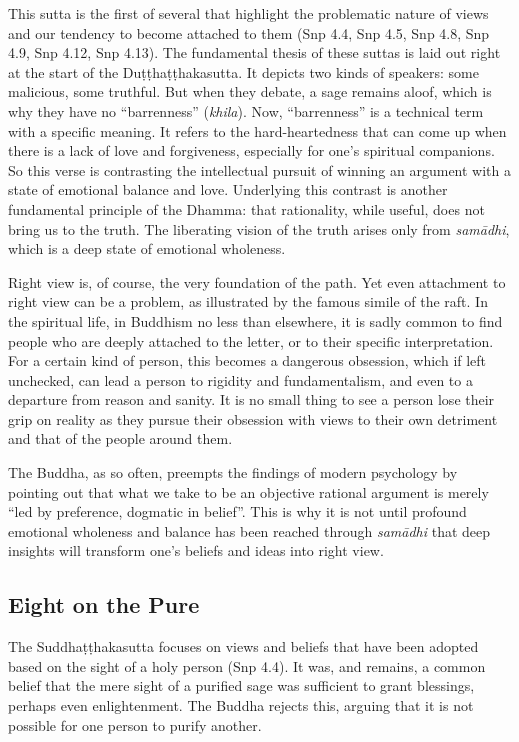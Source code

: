 \documentclass[12pt,openany]{book}%
\begin{document}
This sutta is the first of several that highlight the problematic nature of views and our tendency to become attached to them (Snp 4.4, Snp 4.5, Snp 4.8, Snp 4.9, Snp 4.12, Snp 4.13). The fundamental thesis of these suttas is laid out right at the start of the \textsanskrit{Duṭṭhaṭṭhakasutta}. It depicts two kinds of speakers: some malicious, some truthful. But when they debate, a sage remains aloof, which is why they have no “barrenness” (\textit{khila}). Now, “barrenness” is a technical term with a specific meaning. It refers to the hard-heartedness that can come up when there is a lack of love and forgiveness, especially for one’s spiritual companions. So this verse is contrasting the intellectual pursuit of winning an argument with a state of emotional balance and love. Underlying this contrast is another fundamental principle of the Dhamma: that rationality, while useful, does not bring us to the truth. The liberating vision of the truth arises only from \textit{\textsanskrit{samādhi}}, which is a deep state of emotional wholeness.

Right view is, of course, the very foundation of the path. Yet even attachment to right view can be a problem, as illustrated by the famous simile of the raft. In the spiritual life, in Buddhism no less than elsewhere, it is sadly common to find people who are deeply attached to the letter, or to their specific interpretation. For a certain kind of person, this becomes a dangerous obsession, which if left unchecked, can lead a person to rigidity and fundamentalism, and even to a departure from reason and sanity. It is no small thing to see a person lose their grip on reality as they pursue their obsession with views to their own detriment and that of the people around them.

The Buddha, as so often, preempts the findings of modern psychology by pointing out that what we take to be an objective rational argument is merely “led by preference, dogmatic in belief”. This is why it is not until profound emotional wholeness and balance has been reached through \textit{\textsanskrit{samādhi}} that deep insights will transform one’s beliefs and ideas into right view.

\subsection*{Eight on the Pure}

The \textsanskrit{Suddhaṭṭhakasutta} focuses on views and beliefs that have been adopted based on the sight of a holy person (Snp 4.4). It was, and remains, a common belief that the mere sight of a purified sage was sufficient to grant blessings, perhaps even enlightenment. The Buddha rejects this, arguing that it is not possible for one person to purify another.
\end{document}
